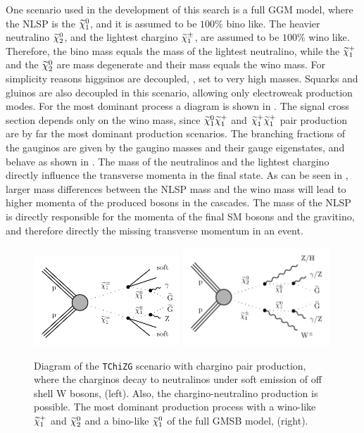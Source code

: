 One scenario used in the development of this search is a full GGM model, where the NLSP is the $\widetilde{\chi}^{0}_{1}$, and it is assumed to be $100\%$ bino like. The heavier neutralino $\widetilde{\chi}^{0}_{2}$, and the lightest chargino $\widetilde{\chi}^\pm_{1}$, are assumed to be $100\%$ wino like. Therefore, the bino mass equals the mass of the lightest neutralino, while the $\widetilde{\chi}^{+}_{1}$ and the $\widetilde{\chi}^{0}_{2}$ are mass degenerate and their mass equals the wino mass. For simplicity reasons higgsinos are decoupled, \ie, set to very high masses. Squarks and gluinos are also decoupled in this scenario, allowing only electroweak production modes. For the most dominant process a diagram is shown in . The signal cross section depends only on the wino mass, since $\widetilde{\chi}^{0}_{1}\widetilde{\chi}^{+}_{1}$ and $\widetilde{\chi}^{+}_{1}\widetilde{\chi}^{+}_{1}$ pair production are by far the most dominant production scenarios. The branching fractions of the gauginos are given by the gaugino masses and their gauge eigenstates, and behave as shown in . The mass of the neutralinos and the lightest chargino directly influence the transverse momenta in the final state. As can be seen in , larger mass differences between the NLSP mass and the wino mass will lead to higher momenta of the produced bosons in the cascades. The mass of the NLSP is directly responsible for the momenta of the final SM bosons and the gravitino, and therefore directly the missing transverse momentum in an event.
\begin{figure}[tbp]
 \centering
 \includegraphics[width=0.49\textwidth]{figures/signal/TChiNG}
 \includegraphics[width=0.49\textwidth]{figures/signal/gmsb}
 \caption{Diagram of the \texttt{TChiZG} scenario with chargino pair production, where the charginos decay to neutralinos under soft emission of off shell W bosons, (left). Also, the chargino-neutralino production is possible. The most dominant production process with a wino-like $\widetilde{\chi}^{+}_{1}$ and $\widetilde{\chi}^{0}_{2}$ and a bino-like $\widetilde{\chi}^{0}_{1}$ of the full GMSB model, (right).}
 \label{fig:ewkSMS}
\end{figure}
